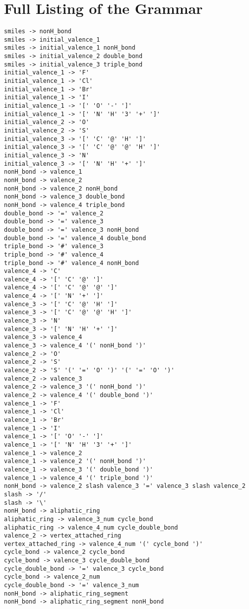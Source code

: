 

\section{Full Listing of the Grammar}\label{app:grammar}
\small
\begin{verbatim}
smiles -> nonH_bond
smiles -> initial_valence_1
smiles -> initial_valence_1 nonH_bond
smiles -> initial_valence_2 double_bond
smiles -> initial_valence_3 triple_bond
initial_valence_1 -> 'F'
initial_valence_1 -> 'Cl'
initial_valence_1 -> 'Br'
initial_valence_1 -> 'I'
initial_valence_1 -> '[' 'O' '-' ']'
initial_valence_1 -> '[' 'N' 'H' '3' '+' ']'
initial_valence_2 -> 'O'
initial_valence_2 -> 'S'
initial_valence_3 -> '[' 'C' '@' 'H' ']'
initial_valence_3 -> '[' 'C' '@' '@' 'H' ']'
initial_valence_3 -> 'N'
initial_valence_3 -> '[' 'N' 'H' '+' ']'
nonH_bond -> valence_1
nonH_bond -> valence_2
nonH_bond -> valence_2 nonH_bond
nonH_bond -> valence_3 double_bond
nonH_bond -> valence_4 triple_bond
double_bond -> '=' valence_2
double_bond -> '=' valence_3
double_bond -> '=' valence_3 nonH_bond
double_bond -> '=' valence_4 double_bond
triple_bond -> '#' valence_3
triple_bond -> '#' valence_4
triple_bond -> '#' valence_4 nonH_bond
valence_4 -> 'C'
valence_4 -> '[' 'C' '@' ']'
valence_4 -> '[' 'C' '@' '@' ']'
valence_4 -> '[' 'N' '+' ']'
valence_3 -> '[' 'C' '@' 'H' ']'
valence_3 -> '[' 'C' '@' '@' 'H' ']'
valence_3 -> 'N'
valence_3 -> '[' 'N' 'H' '+' ']'
valence_3 -> valence_4
valence_3 -> valence_4 '(' nonH_bond ')'
valence_2 -> 'O'
valence_2 -> 'S'
valence_2 -> 'S' '(' '=' 'O' ')' '(' '=' 'O' ')'
valence_2 -> valence_3
valence_2 -> valence_3 '(' nonH_bond ')'
valence_2 -> valence_4 '(' double_bond ')'
valence_1 -> 'F'
valence_1 -> 'Cl'
valence_1 -> 'Br'
valence_1 -> 'I'
valence_1 -> '[' 'O' '-' ']'
valence_1 -> '[' 'N' 'H' '3' '+' ']'
valence_1 -> valence_2
valence_1 -> valence_2 '(' nonH_bond ')'
valence_1 -> valence_3 '(' double_bond ')'
valence_1 -> valence_4 '(' triple_bond ')'
nonH_bond -> valence_2 slash valence_3 '=' valence_3 slash valence_2
slash -> '/'
slash -> '\'
nonH_bond -> aliphatic_ring
aliphatic_ring -> valence_3_num cycle_bond
aliphatic_ring -> valence_4_num cycle_double_bond
valence_2 -> vertex_attached_ring
vertex_attached_ring -> valence_4_num '(' cycle_bond ')'
cycle_bond -> valence_2 cycle_bond
cycle_bond -> valence_3 cycle_double_bond
cycle_double_bond -> '=' valence_3 cycle_bond
cycle_bond -> valence_2_num
cycle_double_bond -> '=' valence_3_num
nonH_bond -> aliphatic_ring_segment
nonH_bond -> aliphatic_ring_segment nonH_bond

\end{verbatim}
